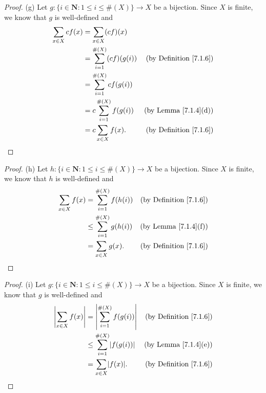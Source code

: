 \begin{proof}{(g)}
    Let \(g : \{i \in \mathbf{N} : 1 \leq i \leq \#(X)\} \to X\) be a bijection.
    Since \(X\) is finite, we know that \(g\) is well-defined and
    \begin{align*}
        \sum_{x \in X} cf(x) & = \sum_{x \in X} (cf)(x)                                               \\
                             & = \sum_{i = 1}^{\#(X)} (cf)(g(i)) & \text{(by Definition \ref{7.1.6})} \\
                             & = \sum_{i = 1}^{\#(X)} cf(g(i))                                        \\
                             & = c\sum_{i = 1}^{\#(X)} f(g(i))   & \text{(by Lemma \ref{7.1.4}(d))}   \\
                             & = c\sum_{x \in X} f(x).           & \text{(by Definition \ref{7.1.6})}
    \end{align*}
\end{proof}

\begin{proof}{(h)}
    Let \(h : \{i \in \mathbf{N} : 1 \leq i \leq \#(X)\} \to X\) be a bijection.
    Since \(X\) is finite, we know that \(h\) is well-defined and
    \begin{align*}
        \sum_{x \in X} f(x) & = \sum_{i = 1}^{\#(X)} f(h(i))    & \text{(by Definition \ref{7.1.6})} \\
                            & \leq \sum_{i = 1}^{\#(X)} g(h(i)) & \text{(by Lemma \ref{7.1.4}(f))}   \\
                            & = \sum_{x \in X} g(x).            & \text{(by Definition \ref{7.1.6})}
    \end{align*}
\end{proof}

\begin{proof}{(i)}
    Let \(g : \{i \in \mathbf{N} : 1 \leq i \leq \#(X)\} \to X\) be a bijection.
    Since \(X\) is finite, we know that \(g\) is well-defined and
    \begin{align*}
        \abs*{\sum_{x \in X} f(x)} & = \abs*{\sum_{i = 1}^{\#(X)} f(g(i))}    & \text{(by Definition \ref{7.1.6})} \\
                                   & \leq \sum_{i = 1}^{\#(X)} \abs*{f(g(i))} & \text{(by Lemma \ref{7.1.4}(e))}   \\
                                   & = \sum_{x \in X} \abs*{f(x)}.            & \text{(by Definition \ref{7.1.6})}
    \end{align*}
\end{proof}

